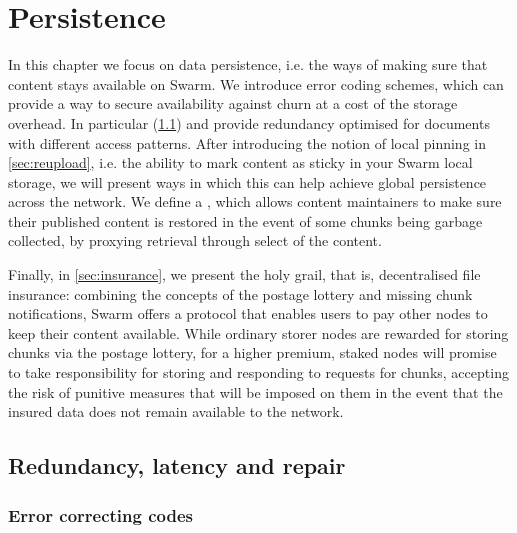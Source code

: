 \chapter{Persistence \statusgreen}\label{sec:persistence}


In this chapter we focus on data persistence, i.e. the ways of making sure that content stays available on Swarm. 
We introduce error coding schemes, which can provide a way to secure availability against churn at a cost of the storage overhead. 
In particular  (\ref{sec:repair}) and   %
provide redundancy optimised for documents with different access patterns.
After introducing the notion of local pinning in \ref{sec:reupload}, i.e. the ability to mark content as sticky in your Swarm local storage, we will present ways in which this can help achieve global persistence across the network. We define a , which allows content maintainers to make sure their published content is restored in the event of some chunks being garbage collected, by proxying retrieval through select  of the content.

Finally, in \ref{sec:insurance}, we present the holy grail, that is, decentralised file insurance: combining the concepts of the postage lottery and missing chunk notifications, Swarm offers a protocol that enables users to pay other nodes to keep their content available. While ordinary storer nodes are rewarded for storing chunks via the postage lottery, for a higher premium, staked nodes will promise to take responsibility for storing and responding to requests for chunks, accepting the risk of punitive measures that will be imposed on them in the event that the insured data does not remain available to the network.


\section{Redundancy, latency and repair \statusgreen}\label{sec:repair}

\green{}

\subsection{Error correcting codes \statusgreen}\label{sec:error-correcting-codes}

